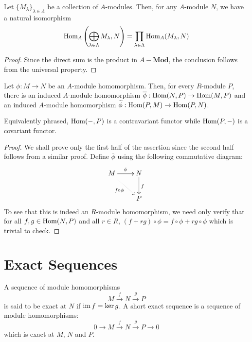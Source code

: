 \begin{proposition}
    Let $\{M_\lambda\}_{\lambda\in\Lambda}$ be a collection of $A$-modules. Then, for any $A$-module $N$, we have a natural isomorphism
    \begin{equation*}
        \operatorname{Hom}_A\left(\bigoplus_{\lambda\in\Lambda}M_\lambda, N\right) = \prod_{\lambda\in\Lambda}\operatorname{Hom}_A(M_\lambda,N)
    \end{equation*}
\end{proposition}
\begin{proof}
    Since the direct sum is the product in $A-\mathbf{Mod}$, the conclusion follows from the universal property.
\end{proof}

\begin{theorem}
    Let $\phi: M\to N$ be an $A$-module homomorphism. Then, for every $R$-module $P$, there is an induced $A$-module homomorphism $\overline\phi:\operatorname{Hom}(N,P)\to\operatorname{Hom}(M,P)$ and an induced $A$-module homomorphism $\widetilde\phi:\operatorname{Hom}(P,M)\to\operatorname{Hom}(P,N)$. 
    
    Equivalently phrased, $\operatorname{Hom}(-,P)$ is a contravariant functor while $\operatorname{Hom}(P,-)$ is a covariant functor.
\end{theorem}
\begin{proof}
    We shall prove only the first half of the assertion since the second half follows from a similar proof. Define $\overline\phi$ using the following commutative diagram: 
    \begin{equation*}
    \xymatrix {
        M\ar[r]^{\phi}\ar@{.>}[rd]_{f\circ\phi} & N\ar[d]^f\\
        & P
    }
    \end{equation*}
    To see that this is indeed an $R$-module homomorphism, we need only verify that for all $f,g\in\operatorname{Hom}(N,P)$ and all $r\in R$, $(f + rg)\circ\phi = f\circ\phi + rg\circ\phi$ which is trivial to check.
\end{proof}

\section{Exact Sequences}

\begin{definition}
    A sequence of module homomorphisms 
    \begin{equation*}
        M\stackrel{f}{\longrightarrow} N\stackrel{g}{\longrightarrow}P
    \end{equation*}
    is said to be exact at $N$ if $\operatorname{im} f = \ker g$. A short exact sequence is a sequence of module homomorphisms: 
    \begin{equation*}
        0\longrightarrow M\stackrel{f}{\longrightarrow} N\stackrel{g}{\longrightarrow} P\longrightarrow 0
    \end{equation*}
    which is exact at $M$, $N$ and $P$.
\end{definition}

